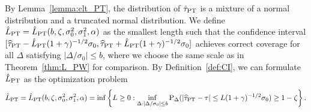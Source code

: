 \documentclass[11pt]{article}
\def\P{{\mathrm P}}
\newcommand{\htau}{\widehat\tau}
\numberwithin{equation}{section}
\theoremstyle{definition}
\begin{document}
By Lemma~\ref{lemma:clt_PT}, the distribution of $\hat\tau_{\rm PT}$ is a mixture of a normal distribution and a truncated normal distribution. We define $\hat{L}_{\rm PT} = \hat{L}_{\rm PT}(b, \zeta, \sigma_0^2, \sigma_1^2, \alpha)$ as the smallest length such that the confidence interval $[\htau_{\rm PT} - \hat{L}_{\rm PT} (1+\gamma)^{-1/2} \sigma_0, \htau_{\rm PT} + \hat{L}_{\rm PT} (1+\gamma)^{-1/2} \sigma_0]$ achieves correct coverage for all $\Delta$ satisfying $\lvert \Delta/\sigma_0 \rvert \le b$, where we choose the same scale as in Theorem~\ref{thm:L_PW} for comparison. By Definition~\ref{def:CI}, we can formulate $\hat{L}_{\rm PT}$ as the optimization problem
\begin{align}\label{eq:L_PT}
  \hat{L}_{\rm PT} = \hat{L}_{\rm PT}(b, \zeta, \sigma_0^2, \sigma_1^2, \alpha) = \inf \left\{ L \ge 0: \inf_{\Delta:\lvert \Delta/\sigma_0 \rvert \le b} \P_\Delta(\lvert \htau_{\rm PT} - \tau \rvert \le L (1+\gamma)^{-1/2} \sigma_0) \ge 1-\zeta\right\}.
\end{align}
\end{document}
